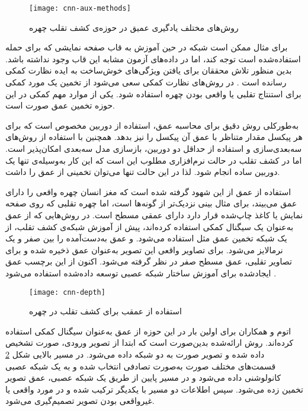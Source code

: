 \begin{figure}[h]
	\centerline{\texttt{[image: cnn-aux-methods]}}
	\caption{روش‌های مختلف یادگیری عمیق در حوزه‌ی کشف تقلب چهره \cite{yu2021deep}}
	\label{fig:cnn-aux-methods}
\end{figure}

برای مثال ممکن است شبکه در حین آموزش به قاب صفحه نمایشی که برای حمله استفاده‌شده است توجه کند، اما در داده‌های آزمون مشابه این قاب وجود نداشته باشد. بدین منظور تلاش محققان برای یافتن ویژگی‌های خوش‌ساخت
 به ایده نظارت کمکی
  رسانده است
\cite{liu2018learning}.  
در روش‌های نظارت کمکی سعی می‌شود از تخمین یک مورد کمکی برای استنتاج تقلبی یا واقعی بودن چهره استفاده شود. یکی از موارد مهم کمکی در این حوزه تخمین عمق صورت است.


به‌طور‌کلی روش دقیق برای محاسبه عمق، استفاده از دوربین مخصوص است که برای هر پیکسل مقدار متناظر با عمق آن پیکسل را نیز بدهد. همچنین با استفاده از روش‌های سه‌بعدی‌سازی و استفاده از حداقل دو دوربین، بازسازی مدل سه‌بعدی امکان‌پذیر است. اما در کشف تقلب در حالت نرم‌افزاری مطلوب این است که این کار به‌وسیله‌ی تنها یک دوربین ساده انجام شود. لذا در این حالت تنها می‌توان تخمینی از عمق را داشت.


استفاده از عمق از این شهود گرفته شده است که مغز انسان چهره واقعی را دارای عمق می‌بیند، برای مثال بینی نزدیک‌تر از گونه‌ها است، اما چهره تقلبی که روی صفحه نمایش یا کاغذ چاپ‌شده قرار دارد دارای عمقی مسطح است. در روش‌هایی که از عمق به‌عنوان یک سیگنال کمکی استفاده کرده‌اند، پیش از آموزش شبکه‌ی کشف تقلب، از یک شبکه تخمین عمق مثل 
 \cite{feng2018joint} 
استفاده می‌شود. و عمق به‌دست‌آمده را بین صفر و یک نرمالایز می‌شود. برای تصاویر واقعی این تصویر به‌عنوان عمق ذخیره شده و برای تصاویر تقلبی، عمق مسطح صفر در نظر گرفته می‌شود. اکنون از این برچسب عمق ایجاد‌شده برای آموزش ساختار شبکه عصبی توسعه داده‌شده استفاده می‌شود
\cite{atoum2017face,yu2020searching,shao2019multi,liu2018learning,wang2020deep,wang2018exploiting}.
\begin{figure}[h]
	\centerline{\texttt{[image: cnn-depth]}}
	\caption{استفاده از عمقب برای کشف تقلب در چهره  \cite{atoum2017face}}
	\label{fig:cnn-depth}
\end{figure}

اتوم و همکاران
\cite{atoum2017face}
  برای اولین بار در این حوزه از عمق به‌عنوان سیگنال کمکی استفاده کرده‌اند. روش ارائه‌شده بدین‌صورت است که ابتدا از تصویر ورودی، صورت تشخیص داده شده و تصویر صورت به دو شبکه داده می‌شود. در مسیر بالایی شکل
\ref{fig:cnn-depth}
   قسمت‌های مختلف صورت به‌صورت تصادفی انتخاب شده و به یک شبکه عصبی کانولوشنی داده می‌شود و در مسیر پایین از طریق یک شبکه عصبی، عمق تصویر تخمین زده می‌شود. سپس اطلاعات دو مسیر با یکدیگر ترکیب شده و در مورد واقعی یا غیرواقعی بودن تصویر تصمیم‌گیری می‌شود.
   
